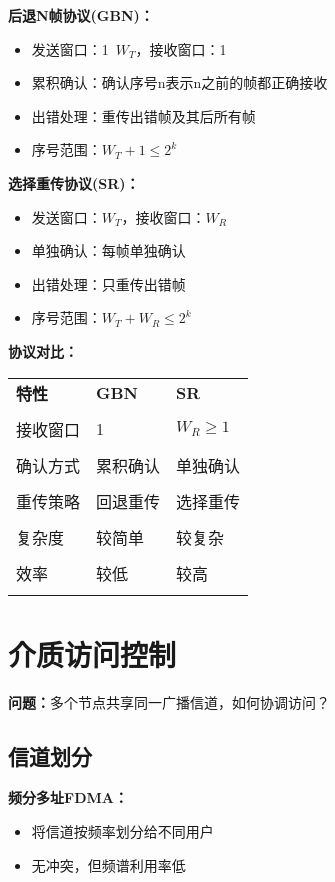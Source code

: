 \documentclass[lang=cn,newtx,10pt,scheme=chinese]{../../elegantbook}
\begin{document}
\textbf{后退N帧协议(GBN)：}
\begin{itemize}
  \item 发送窗口：1~$W_T$，接收窗口：1
  \item 累积确认：确认序号n表示n之前的帧都正确接收
  \item 出错处理：重传出错帧及其后所有帧
  \item 序号范围：$W_T + 1 \leq 2^k$
\end{itemize}

\textbf{选择重传协议(SR)：}
\begin{itemize}
  \item 发送窗口：$W_T$，接收窗口：$W_R$
  \item 单独确认：每帧单独确认
  \item 出错处理：只重传出错帧
  \item 序号范围：$W_T + W_R \leq 2^k$
\end{itemize}

\textbf{协议对比：}
\begin{longtable}{@{}p{3cm}p{5cm}p{5cm}@{}}
\toprule
\textbf{特性} & \textbf{GBN} & \textbf{SR} \\\\ \midrule
\endhead

接收窗口 & 1 & $W_R \geq 1$ \\\\
确认方式 & 累积确认 & 单独确认 \\\\
重传策略 & 回退重传 & 选择重传 \\\\
复杂度 & 较简单 & 较复杂 \\\\
效率 & 较低 & 较高 \\\\

\bottomrule
\end{longtable}

\section{介质访问控制}

\textbf{问题：}多个节点共享同一广播信道，如何协调访问？

\subsection{信道划分}

\textbf{频分多址FDMA：}
\begin{itemize}
  \item 将信道按频率划分给不同用户
  \item 无冲突，但频谱利用率低
\end{itemize}
\end{document}
